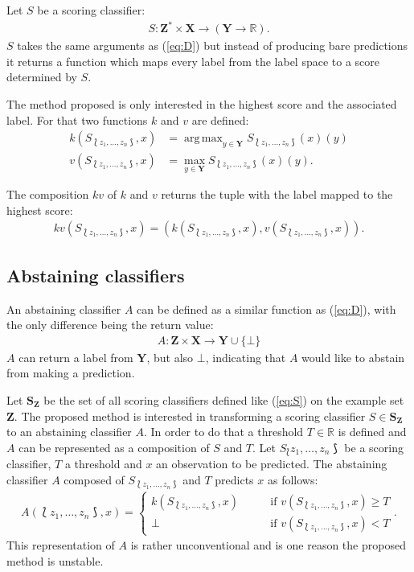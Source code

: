 \documentclass[twoside,11pt]{article}
\DeclareMathOperator*{\argmax}{arg\,max}
\def\ds{\Lbag z_1,\dots,z_n \Rbag}
\def\Z{\textbf{Z}}
\def\S{\textbf{S}_{\Z}}
\begin{document}
Let $S$ be a scoring classifier:
\begin{align}
  \label{eq:S}
  S: \textbf{Z}^* \times \textbf{X} \rightarrow
     (\textbf{Y} \rightarrow \mathbb{R}).
\end{align}
$S$ takes the same arguments as (\ref{eq:D}) but instead
of producing bare predictions it returns a function which
maps every label from the label space to a score
determined by $S$.

The method proposed is only interested in the highest
score and the associated label. For that two functions
$k$ and $v$ are defined:
\begin{align*}
  k(S_{\ds}, x) &= \argmax_{y \in \textbf{Y}}
    S_{\ds}(x)(y) \\
  v(S_{\ds}, x) &= \max_{y \in \textbf{Y}}
    S_{\ds}(x)(y).
\end{align*}

The composition $kv$ of $k$ and $v$ returns the tuple with
the label mapped to the highest score:
\begin{align}
  \label{eq:kv}
  kv(S_{\ds}, x) = (k(S_{\ds}, x), v(S_{\ds}, x)).
\end{align}

\subsection{Abstaining classifiers}

An abstaining classifier $A$ can be defined as a similar
function as (\ref{eq:D}), with the only difference being
the return value:
\begin{align*}
  A: \textbf{Z} \times \textbf{X} \rightarrow
      \textbf{Y} \cup \{\bot\}
\end{align*}
$A$ can return a label from $\textbf{Y}$, but also $\bot$,
indicating that $A$ would like to abstain from making a
prediction.

Let $\S$ be the set of all scoring classifiers defined like
(\ref{eq:S}) on the example set $\Z$.
The proposed method is interested in transforming a
scoring classifier $S \in \S$ to an abstaining classifier
$A$.
In order to do that a threshold $T \in \mathbb{R}$ is
defined and $A$ can be represented as a composition of $S$
and $T$.
Let $S_\ds$ be a scoring classifier, $T$ a threshold and
$x$ an observation to be predicted.
The abstaining classifier $A$ composed of $S_{\ds}$ and $T$
predicts $x$ as follows:
\begin{align}
  \label{eq:A}
  A(\ds, x) =
    \begin{cases}
      k(S_{\ds}, x) &\qquad \text{if }v(S_{\ds}, x)\geq T\\
      \bot &\qquad \text{if } v(S_{\ds}, x) < T
    \end{cases}.
\end{align}
This representation of $A$ is rather unconventional and
is one reason the proposed method is unstable.
\end{document}
